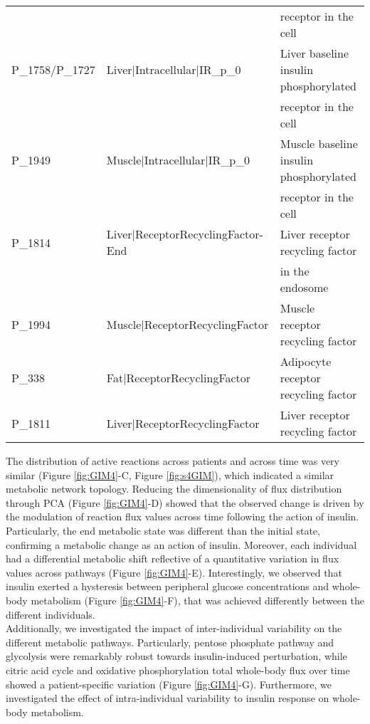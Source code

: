 \begin{table}[!htp]
\begin{center}
\begin{tabular*}{\textwidth}{l @{\extracolsep{\fill}} ll}
	& & receptor in the cell   \\
	P\_1758/P\_1727            & Liver|Intracellular|IR\_p\_0 & Liver baseline insulin phosphorylated  \\
	& & receptor in the cell \\
	P\_1949 & Muscle|Intracellular|IR\_p\_0 & Muscle baseline insulin phosphorylated       \\
	& & receptor in the cell \\
	P\_1814          & Liver|ReceptorRecyclingFactor-End  & Liver receptor recycling factor\\
	& & in the endosome        \\
	P\_1994         & Muscle|ReceptorRecyclingFactor & Muscle receptor recycling factor \\
    P\_338 & Fat|ReceptorRecyclingFactor        & Adipocyte receptor recycling factor     \\
    P\_1811            & Liver|ReceptorRecyclingFactor & Liver receptor recycling factor \\
	\hline
	\end{tabular*}
\end{center}
\label{GIM:tbl1}%
\end{table}
The distribution of active reactions across patients and across time was very similar (Figure \ref{fig:GIM4}-C, Figure \ref{fig:s4GIM}), which indicated a similar metabolic network topology. Reducing the dimensionality of flux distribution through PCA (Figure \ref{fig:GIM4}-D) showed that the observed change is driven by the modulation of reaction flux values across time following the action of insulin. Particularly, the end metabolic state was different than the initial state, confirming a metabolic change as an action of insulin. Moreover, each individual had a differential metabolic shift reflective of a quantitative variation in flux values across pathways (Figure \ref{fig:GIM4}-E). Interestingly, we observed that insulin exerted a hysteresis between peripheral glucose concentrations and whole-body metabolism (Figure \ref{fig:GIM4}-F), that was achieved differently between the different individuals.\\
Additionally, we investigated the impact of inter-individual variability on the different metabolic pathways. Particularly, pentose phosphate pathway and glycolysis were remarkably robust towards insulin-induced perturbation, while citric acid cycle and oxidative phosphorylation total whole-body flux over time showed a patient-specific variation (Figure \ref{fig:GIM4}-G). Furthermore, we investigated the effect of intra-individual variability to insulin response on whole-body metabolism.
